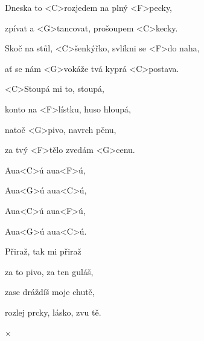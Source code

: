 

\zr
Dneska to <C>rozjedem na plný <F>pecky,

zpívat a <G>tancovat, prošoupem <C>kecky.

Skoč na stůl, <C>šenkýřko, svlíkni se <F>do naha,

ať se nám <G>vokáže tvá kyprá <C>postava.
\kr


\zs
<C>Stoupá mi to, stoupá,

konto na <F>lístku, huso hloupá,

natoč <G>pivo, navrch pěnu,

za tvý <F>tělo zvedám <G>cenu.
\ks

\zr \kr

\zr
Aua<C>ú aua<F>ú,

Aua<G>ú aua<C>ú,



Aua<C>ú aua<F>ú,

Aua<G>ú aua<C>ú.
\kr


\zs
Přiraž, tak mi přiraž

za to pivo, za ten guláš,

zase dráždíš moje chutě,

rozlej prcky, lásko, zvu tě.
\ks


×\kr

\kp
